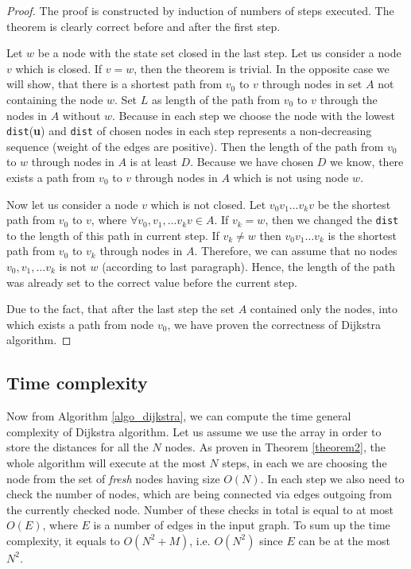\documentclass[thesis=M,english]{FITthesis}[2012/10/20]
\begin{document}
\begin{proof}
The proof is constructed by induction of numbers of steps executed. The theorem is clearly correct before and after the first step. 

Let $w$ be a node with the state set closed in the last step. Let us consider a node $v$ which is closed.
If $v=w$, then the theorem is trivial. In the opposite case we will show, that there is a shortest path from $v_0$ to $v$ through nodes in set $A$ not containing the node $w$. Set $L$ as length of the path from $v_0$ to $v$ through the nodes in $A$ without $w$. Because in each step we choose the node with the lowest \texttt{dist}(\textbf{u}) and \texttt{dist} of chosen nodes in each step represents a non-decreasing sequence (weight of the edges are positive). Then the length of the path from $v_0$ to $w$ through nodes in $A$ is at least $D$. Because we have chosen $D$ we know, there exists a path from $v_0$ to $v$ through nodes in $A$ which is not using node $w$.

Now let us consider a node $v$ which is not closed. Let $v_0 v_1 \dots v_k v$ be the shortest path from $v_0$ to $v$, where $\forall v_0, v_1, \dots v_k v \in A$. 
If $v_k = w$, then we changed the \texttt{dist} to the length of this path in current step. If $v_k \neq w$ then $v_0 v_1 \dots v_k$ is the shortest path from $v_0$ to $v_k$ through nodes in $A$. Therefore, we can assume that no nodes $v_0, v_1, \dots v_k $ is not $w$ (according to last paragraph). Hence, the length of the path was already set to the correct value before the current step.

Due to the fact, that after the last step the set $A$ contained only the nodes, into which exists a path from node $v_0$, we have proven the correctness of Dijkstra algorithm.
\end{proof}

\subsection{Time complexity}
Now from Algorithm \ref{algo_dijkstra}, we can compute the time general complexity of Dijkstra algorithm. Let us assume we use the array in order to store the distances for all the $N$ nodes. As proven in Theorem \ref{theorem2}, the whole algorithm will execute at the most $N$ steps, in each we are choosing the node from the set of \textit{fresh} nodes having size $O(N)$. In each step we also need to check the number of nodes, which are being connected via edges outgoing from the currently checked node. Number of these checks in total is equal to at most $O(E)$, where $E$ is a number of edges in the input graph. To sum up the time complexity, it equals to $O(N^2 + M)$, i.e. $O(N^2)$ since $E$ can be at the most $N^2$.
\end{document}
